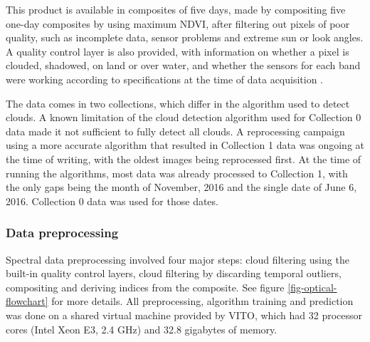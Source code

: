\documentclass[a4paper,12pt]{scrbook}
\begin{document}
This product is available in composites of five days, made by compositing five one-day composites by using maximum NDVI, after filtering out pixels of poor quality, such as incomplete data, sensor problems and extreme sun or look angles. A quality control layer is also provided, with information on whether a pixel is clouded, shadowed, on land or over water, and whether the sensors for each band were working according to specifications at the time of data acquisition \citep{probavguide2}.

The data comes in two collections, which differ in the algorithm used to detect clouds. A known limitation of the cloud detection algorithm used for Collection 0 data made it not sufficient to fully detect all clouds. A reprocessing campaign using a more accurate algorithm that resulted in Collection 1 data \citep{probavguide2} was ongoing at the time of writing, with the oldest images being reprocessed first. At the time of running the algorithms, most data was already processed to Collection 1, with the only gaps being the month of November, 2016 and the single date of June 6, 2016. Collection 0 data was used for those dates.

\subsubsection{Data preprocessing}
\label{sec-spectral-preprocessing}

Spectral data preprocessing involved four major steps: cloud filtering using the built-in quality control layers, cloud filtering by discarding temporal outliers, compositing and deriving indices from the composite. See figure \ref{fig-optical-flowchart} for more details. All preprocessing, algorithm training and prediction was done on a shared virtual machine provided by VITO, which had 32 processor cores (Intel Xeon E3, 2.4 GHz) and 32.8 gigabytes of memory.
\end{document}
